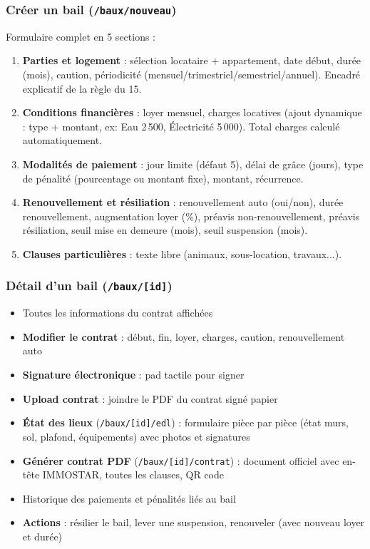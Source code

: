 \documentclass[12pt,a4paper]{article}
\begin{document}
\subsubsection{Cr\'eer un bail (\texttt{/baux/nouveau})}
Formulaire complet en 5 sections :

\begin{enumerate}
\item \textbf{Parties et logement} : s\'election locataire + appartement, date d\'ebut, dur\'ee (mois), caution, p\'eriodicit\'e (mensuel/trimestriel/semestriel/annuel). Encadr\'e explicatif de la r\`egle du 15.

\item \textbf{Conditions financi\`eres} : loyer mensuel, charges locatives (ajout dynamique : type + montant, ex: Eau 2\,500, \'Electricit\'e 5\,000). Total charges calcul\'e automatiquement.

\item \textbf{Modalit\'es de paiement} : jour limite (d\'efaut 5), d\'elai de gr\^ace (jours), type de p\'enalit\'e (pourcentage ou montant fixe), montant, r\'ecurrence.

\item \textbf{Renouvellement et r\'esiliation} : renouvellement auto (oui/non), dur\'ee renouvellement, augmentation loyer (\%), pr\'eavis non-renouvellement, pr\'eavis r\'esiliation, seuil mise en demeure (mois), seuil suspension (mois).

\item \textbf{Clauses particuli\`eres} : texte libre (animaux, sous-location, travaux...).
\end{enumerate}

\subsubsection{D\'etail d'un bail (\texttt{/baux/[id]})}
\begin{itemize}
\item Toutes les informations du contrat affich\'ees
\item \textbf{Modifier le contrat} : d\'ebut, fin, loyer, charges, caution, renouvellement auto
\item \textbf{Signature \'electronique} : pad tactile pour signer
\item \textbf{Upload contrat} : joindre le PDF du contrat sign\'e papier
\item \textbf{\'Etat des lieux} (\texttt{/baux/[id]/edl}) : formulaire pi\`ece par pi\`ece (\'etat murs, sol, plafond, \'equipements) avec photos et signatures
\item \textbf{G\'en\'erer contrat PDF} (\texttt{/baux/[id]/contrat}) : document officiel avec en-t\^ete IMMOSTAR, toutes les clauses, QR code
\item Historique des paiements et p\'enalit\'es li\'es au bail
\item \textbf{Actions} : r\'esilier le bail, lever une suspension, renouveler (avec nouveau loyer et dur\'ee)
\end{itemize}
\end{document}
